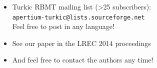 \documentclass[a0paper,fontscale=0.3]{baposter}  %
\begin{document}
\begin{poster}
{\begin{itemize}
				\item Turkic RBMT mailing list (>25 subscribers):\\
				\texttt{apertium-turkic@lists.sourceforge.net}\\
				\vspace{-0.5ex}Feel free to post in any language!\\\vspace{-2.5ex}
				\item See our paper in the LREC 2014 proceedings
				\item And feel free to contact the authors any time!
			\end{itemize}
		}




	\end{poster}
\end{document}
